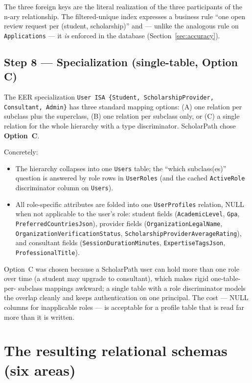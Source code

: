 \documentclass[11pt,a4paper]{article}
\begin{document}
The three foreign keys are the literal realization of the three participants of
the n-ary relationship. The filtered-unique index expresses a business rule
``one open review request per (student, scholarship)'' and --- unlike the
analogous rule on \texttt{Applications} --- it \emph{is} enforced in the
database (Section~\ref{sec:accuracy}).

\subsection{Step 8 --- Specialization (single-table, Option C)}

The EER specialization \texttt{User ISA \{Student, ScholarshipProvider,
Consultant, Admin\}} has three standard mapping options: (A) one relation per subclass plus
the superclass, (B) one relation per subclass only, or (C) a single relation for
the whole hierarchy with a type discriminator. ScholarPath chose
\textbf{Option~C}.

Concretely:

\begin{itemize}[leftmargin=1.4em]
  \item The hierarchy collapses into one \texttt{Users} table; the
        ``which subclass(es)'' question is answered by role rows in
        \texttt{UserRoles} (and the cached \texttt{ActiveRole} discriminator
        column on \texttt{Users}).
  \item All role-specific attributes are folded into one \texttt{UserProfiles}
        relation, NULL when not applicable to the user's role: student fields
        (\texttt{AcademicLevel}, \texttt{Gpa}, \texttt{PreferredCountriesJson}),
        provider fields (\texttt{OrganizationLegalName},
        \texttt{OrganizationVerificationStatus},
        \texttt{ScholarshipProviderAverageRating}), and consultant fields
        (\texttt{SessionDurationMinutes}, \texttt{ExpertiseTagsJson},
        \texttt{ProfessionalTitle}).
\end{itemize}

Option~C was chosen because a ScholarPath user can hold more than one role over
time (a student may upgrade to consultant), which makes rigid one-table-per-
subclass mappings awkward; a single table with a role discriminator models the
overlap cleanly and keeps authentication on one principal. The cost --- NULL
columns for inapplicable roles --- is acceptable for a profile table that is
read far more than it is written.

\section{The resulting relational schemas (six areas)}
\label{sec:figures}
\end{document}
